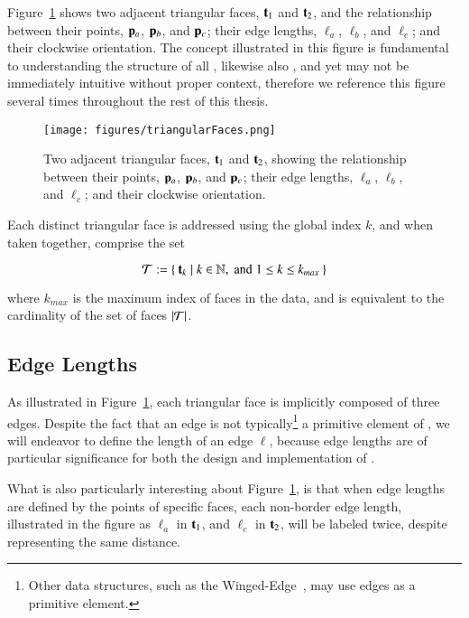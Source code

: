 Figure~\ref{fig:triangularFaces} shows two adjacent triangular faces, $\mathbf{t}_1$ and $\mathbf{t}_2$, and the relationship between their points, $\mathbf{p}_a$, $\mathbf{p}_b$, and $\mathbf{p}_c$; their edge lengths, $\ell_a$, $\ell_b$, and $\ell_c$; and their clockwise orientation. The concept illustrated in this figure is fundamental to understanding the structure of all \tdd{}, likewise also , and yet may not be immediately intuitive without proper context, therefore we reference this figure several times throughout the rest of this thesis.

\begin{figure}[ht]
\ffigbox
	{\texttt{[image: figures/triangularFaces.png]}}
	{\caption[Two Adjacent Triangular Faces]{Two adjacent triangular faces, $\mathbf{t}_1$ and $\mathbf{t}_2$, showing the relationship between their points, $\mathbf{p}_a$, $\mathbf{p}_b$, and $\mathbf{p}_c$; their edge lengths, $\ell_a$, $\ell_b$, and $\ell_c$; and their clockwise orientation.}\label{fig:triangularFaces}}
\end{figure}

Each distinct triangular face is addressed using the global index $k$, and when taken together, comprise the set

\begin{equation}
	\mathcal{T} := \left \{\:\mathbf{t}_k \mid k \in \mathbb{N}, \;\text{and}\; 1\leq k \leq k_{max}\:\right \}
	\label{eq:defineSetOfFaces}
\end{equation}

where $k_{max}$ is the maximum index of faces in the data, and is equivalent to the cardinality of the set of faces $|\mathcal{T}|$.%
%
%

%
%
%
%
\subsection{Edge Lengths}
\label{ch2sTDDssEL}
As illustrated in Figure~\ref{fig:triangularFaces}, each triangular face is implicitly composed of three edges. Despite the fact that an edge is not typically\footnote{Other data structures, such as the Winged-Edge~\cite[p.~1]{Baumgart75}, may use edges as a primitive element.} a primitive element of \tdd{}, we will endeavor to define the length of an edge $\ell$, because edge lengths are of particular significance for both the design and implementation of .

What is also particularly interesting about Figure~\ref{fig:triangularFaces}, is that when edge lengths are defined by the points of specific faces, each non-border edge length, illustrated in the figure as $\ell_a$ in $\mathbf{t}_1$, and $\ell_c$ in $\mathbf{t}_2$, will be labeled twice, despite representing the same distance.

